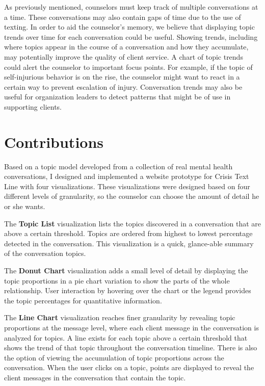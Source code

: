 As previously mentioned, counselors must keep track of multiple conversations
at a time. These conversations may also contain gaps of time due to the use of
texting. In order to aid the counselor's memory, we believe that displaying topic
trends over time for each conversation could be useful. Showing trends, including
where topics appear in the course of a conversation and how they accumulate, may
potentially improve the quality of client service. A chart of topic trends could alert the
counselor to important focus points. For example, if the topic of self-injurious behavior
is on the rise, the counselor might want to react in a certain way to prevent escalation
of injury. Conversation trends may also be useful for organization leaders to detect
patterns that might be of use in supporting clients.

\section{Contributions}

Based on a topic model developed from a collection of real mental health
conversations, I designed and implemented a website prototype for Crisis Text
Line with four visualizations. These visualizations were designed based on four
different levels of granularity, so the counselor can choose the amount of detail
he or she wants.

The \textbf{Topic List} visualization lists the topics discovered in a conversation that
are above a certain threshold. Topics are ordered from highest to lowest percentage
detected in the conversation. This visualization is a quick, glance-able summary of the
conversation topics.

The \textbf{Donut Chart} visualization adds a small level of detail by displaying the
topic proportions in a pie chart variation to show the parts of the whole relationship.
User interaction by hovering over the chart or the legend provides the topic
percentages for quantitative information.

The \textbf{Line Chart} visualization reaches finer granularity by revealing topic
proportions at the message level, where each client message in the conversation
is analyzed for topics. A line exists for each topic above a certain threshold that
shows the trend of that topic throughout the conversation timeline. There is also
the option of viewing the accumulation of topic proportions across the conversation.
When the user clicks on a topic, points are displayed to reveal the client messages
in the conversation that contain the topic.

